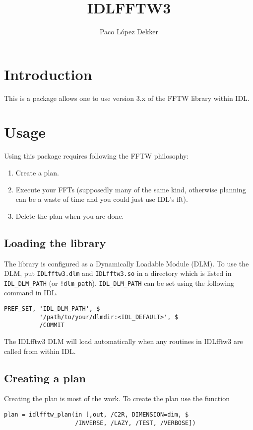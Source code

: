 \documentclass[a4paper,11pt]{article}
\title{IDLFFTW3}
\author{Paco López Dekker}
\begin{document}
\maketitle

\section{Introduction}

This is a package allows one to use version 3.x of the FFTW library within IDL.

\section{Usage}

Using this package requires following the FFTW philosophy:
\begin{enumerate}
\item Create a plan.
\item Execute your FFTs (supposedly many of the same kind, otherwise planning can be a waste of time and you could just use IDL's fft).
\item Delete the plan when you are done.
\end{enumerate}

\subsection{Loading the library}

The library is configured as a Dynamically Loadable Module (DLM). To use the DLM, put \texttt{IDLfftw3.dlm} and \texttt{IDLfftw3.so} in a directory which is listed in \texttt{IDL\_DLM\_PATH} (or \texttt{!dlm\_path}). \texttt{IDL\_DLM\_PATH} can be set using the following command in IDL.
\begin{verbatim}
PREF_SET, 'IDL_DLM_PATH', $
          '/path/to/your/dlmdir:<IDL_DEFAULT>', $
          /COMMIT
\end{verbatim}
The IDLfftw3 DLM will load automatically when any routines in IDLfftw3 are called from within IDL.

\subsection{Creating a plan}

Creating the plan is most of the work. To create the plan use the function
\begin{verbatim}
plan = idlfftw_plan(in [,out, /C2R, DIMENSION=dim, $
                    /INVERSE, /LAZY, /TEST, /VERBOSE])
\end{verbatim}
\end{document}
